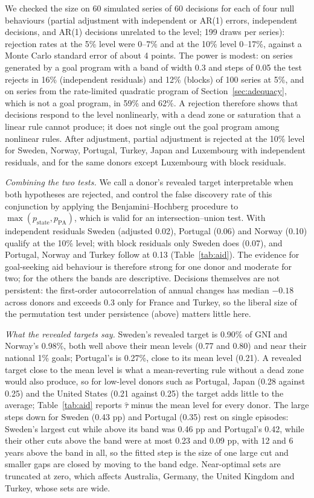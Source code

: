 \documentclass[pdflatex,sn-basic]{sn-jnl}
\theoremstyle{thmstyleone}\newtheorem{proposition}{Proposition}\newtheorem{theorem}{Theorem}
\theoremstyle{thmstylethree}\newtheorem{remark}{Remark}
\begin{document}
We checked the size on 60 simulated series of 60 decisions for each of four null behaviours (partial adjustment with independent or AR(1) errors, independent decisions, and AR(1) decisions unrelated to the level; 199 draws per series): rejection rates at the 5\% level were 0--7\% and at the 10\% level 0--17\%, against a Monte Carlo standard error of about 4 points. The power is modest: on series generated by a goal program with a band of width 0.3 and steps of 0.05 the test rejects in 16\% (independent residuals) and 12\% (blocks) of 100 series at 5\%, and on series from the rate-limited quadratic program of Section~\ref{sec:adequacy}, which is not a goal program, in 59\% and 62\%. A rejection therefore shows that decisions respond to the level nonlinearly, with a dead zone or saturation that a linear rule cannot produce; it does not single out the goal program among nonlinear rules. After adjustment, partial adjustment is rejected at the 10\% level for Sweden, Norway, Portugal, Turkey, Japan and Luxembourg with independent residuals, and for the same donors except Luxembourg with block residuals.

\emph{Combining the two tests.} We call a donor's revealed target interpretable when both hypotheses are rejected, and control the false discovery rate of this conjunction by applying the Benjamini--Hochberg procedure to $\max(p_{\mathrm{state}},p_{\mathrm{PA}})$, which is valid for an intersection--union test. With independent residuals Sweden (adjusted 0.02), Portugal (0.06) and Norway (0.10) qualify at the 10\% level; with block residuals only Sweden does (0.07), and Portugal, Norway and Turkey follow at 0.13 (Table~\ref{tab:aid}). The evidence for goal-seeking aid behaviour is therefore strong for one donor and moderate for two; for the others the bands are descriptive. Decisions themselves are not persistent: the first-order autocorrelation of annual changes has median $-0.18$ across donors and exceeds 0.3 only for France and Turkey, so the liberal size of the permutation test under persistence (above) matters little here.

\emph{What the revealed targets say.} Sweden's revealed target is 0.90\% of GNI and Norway's 0.98\%, both well above their mean levels (0.77 and 0.80) and near their national 1\% goals; Portugal's is 0.27\%, close to its mean level (0.21). A revealed target close to the mean level is what a mean-reverting rule without a dead zone would also produce, so for low-level donors such as Portugal, Japan (0.28 against 0.25) and the United States (0.21 against 0.25) the target adds little to the average; Table~\ref{tab:aid} reports $\hat\tau$ minus the mean level for every donor. The large steps down for Sweden (0.43 pp) and Portugal (0.35) rest on single episodes: Sweden's largest cut while above its band was 0.46 pp and Portugal's 0.42, while their other cuts above the band were at most 0.23 and 0.09 pp, with 12 and 6 years above the band in all, so the fitted step is the size of one large cut and smaller gaps are closed by moving to the band edge. Near-optimal sets are truncated at zero, which affects Australia, Germany, the United Kingdom and Turkey, whose sets are wide.
\end{document}
